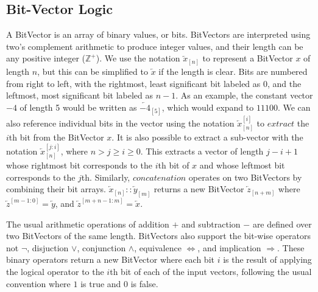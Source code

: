 \documentclass[a4paper,12pt]{article}
\begin{document}
\subsection{Bit-Vector Logic}\label{bvlogic}
A BitVector is an array of binary values, or bits. BitVectors are interpreted
using two's complement arithmetic to produce integer values, and their length
can be any positive integer (\(\mathbb{Z}^+\)). We use the notation
\(\overleftarrow{x}_{[n]}\) to represent a BitVector \(x\) of length \(n\), but
this can be simplified to \(\overleftarrow{x}\) if the length is clear. Bits are
numbered from right to left, with the rightmost, least significant bit labeled
as 0, and the leftmost, most significant bit labeled as \(n-1\). As an example,
the constant vector \(-4\) of length 5 would be written as
\(\overleftarrow{-4}_{[5]}\), which would expand to \(11100\). We can also
reference individual bits in the vector using the notation
\(\overleftarrow{x}_{[n]}^{[i]}\) to \(extract\) the \(i\)th bit from the
BitVector \(x\). It is also possible to extract a sub-vector with the notation
\(\overleftarrow{x}_{[n]}^{[j:i]}\), where \(n>j\geq i\geq 0\). This extracts a
vector of length \(j-i+1\) whose rightmost bit corresponds to the \(i\)th bit of
\(x\) and whose leftmost bit corresponds to the \(j\)th. Similarly,
\(concatenation\) operates on two BitVectors by combining their bit arrays.
\(\overleftarrow{x}_{[n]} :: \overleftarrow{y}_{[m]}\) returns a new BitVector
\(\overleftarrow{z}_{[n+m]}\) where \(\overleftarrow{z}^{[m-1:0]} =
\overleftarrow{y}\), and \(\overleftarrow{z}^{[m+n-1:m]} = \overleftarrow{x}\).

The usual arithmetic operations of addition \(+\) and subtraction \(-\) are
defined over two BitVectors of the same length. BitVectors also support the
bit-wise operators not \(\neg\), disjuction \(\lor\), conjunction \(\land\),
equivalence \(\iff\), and implication \(\Rightarrow\). These binary operators return a
new BitVector where each bit \(i\) is the result of applying the logical
operator to the \(i\)th bit of each of the input vectors, following the usual
convention where \(1\) is true and \(0\) is false.
\end{document}
